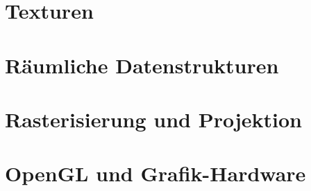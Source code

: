 \documentclass[10pt,a4paper]{article}
\begin{document}
	\newpage
	\section{Texturen}

	\newpage
	\section{Räumliche Datenstrukturen}

	\newpage
	\section{Rasterisierung und Projektion}

	\newpage
	\section{OpenGL und Grafik-Hardware}

	\newpage
	\printnoidxglossary
\end{document}
